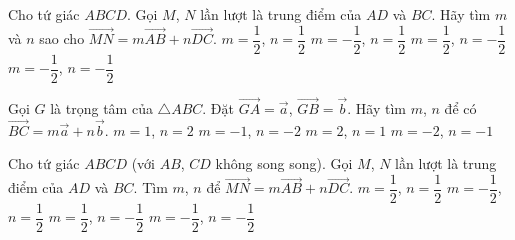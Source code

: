 \begin{ex}%
	Cho tứ giác $ABCD$. Gọi $M$, $N$ lần lượt là trung điểm của $AD$ và $BC$. Hãy tìm $m$ và $n$ sao cho $\overrightarrow{MN}=m\overrightarrow{AB}+n\overrightarrow{DC}$.
	\choice
	{\True $m=\dfrac{1}{2}$, $n=\dfrac{1}{2}$}
	{$m=-\dfrac{1}{2}$, $n=\dfrac{1}{2}$}
	{$m=\dfrac{1}{2}$, $n=-\dfrac{1}{2}$}
	{$m=-\dfrac{1}{2}$, $n=-\dfrac{1}{2}$}
\end{ex}

\begin{ex}%
	Gọi $G$ là trọng tâm của $\triangle ABC$. Đặt $\overrightarrow{GA}=\overrightarrow{a}$, $\overrightarrow{GB}=\overrightarrow{b}$. Hãy tìm $m$, $n$ để có $\overrightarrow{BC}=m\overrightarrow{a}+n\overrightarrow{b}$.
	\choice
	{$m=1$, $n=2$}
	{\True $m=-1$, $n=-2$}
	{$m=2$, $n=1$}
	{$m=-2$, $n=-1$}
\end{ex}

\begin{ex}%
	Cho tứ giác $ABCD$ (với $AB$, $CD$ không song song). Gọi $M$, $N$ lần lượt là trung điểm của $AD$ và $BC$. Tìm $m$, $n$ để $\overrightarrow{MN}=m\overrightarrow{AB}+n\overrightarrow{DC}$.
	\choice
	{\True $m=\dfrac{1}{2}$, $n=\dfrac{1}{2}$}
	{$m=-\dfrac{1}{2}$, $n=\dfrac{1}{2}$}
	{$m=\dfrac{1}{2}$, $n=-\dfrac{1}{2}$}
	{$m=-\dfrac{1}{2}$, $n=-\dfrac{1}{2}$}
\end{ex}

